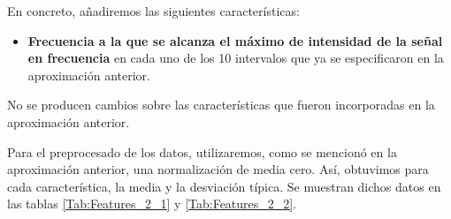 \documentclass[12pt]{article}
\begin{document}
En concreto, añadiremos las siguientes características:

\begin{itemize}
	\item \textbf{Frecuencia a la que se alcanza el máximo de intensidad de la señal en frecuencia} en cada uno de los 10 intervalos
	que ya se especificaron en la aproximación anterior.
\end{itemize}

No se producen cambios sobre las características que fueron incorporadas en la aproximación anterior.



Para el preprocesado de los datos, utilizaremos, como se mencionó en la aproximación anterior,
una normalización de media cero.
Así, obtuvimos para cada característica, la media y la desviación típica. Se muestran dichos datos en las tablas \ref{Tab:Features_2_1}
y \ref{Tab:Features_2_2}.

\bigskip
\end{document}
